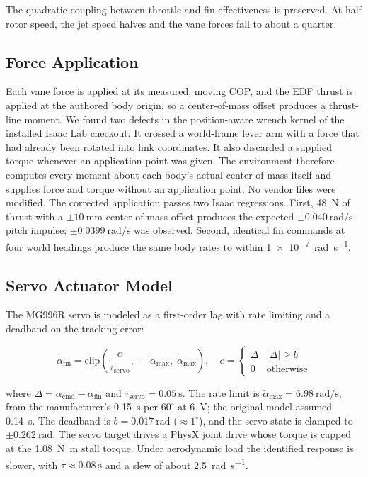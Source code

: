 \documentclass[conference]{IEEEtran}
\begin{document}
The quadratic coupling between throttle and fin effectiveness is preserved. At half rotor speed, the jet speed halves and the vane forces fall to about a quarter.

\subsection{Force Application}

Each vane force is applied at its measured, moving COP, and the EDF thrust is applied at the authored body origin, so a center-of-mass offset produces a thrust-line moment. We found two defects in the position-aware wrench kernel of the installed Isaac Lab checkout. It crossed a world-frame lever arm with a force that had already been rotated into link coordinates. It also discarded a supplied torque whenever an application point was given. The environment therefore computes every moment about each body's actual center of mass itself and supplies force and torque without an application point. No vendor files were modified. The corrected application passes two Isaac regressions. First, \SI{48}{\newton} of thrust with a $\pm\SI{10}{\milli\metre}$ center-of-mass offset produces the expected $\pm\SI{0.040}{\radian\per\second}$ pitch impulse; $\pm\SI{0.0399}{\radian\per\second}$ was observed. Second, identical fin commands at four world headings produce the same body rates to within \SI{1e-7}{\radian\per\second}.

\subsection{Servo Actuator Model}

The MG996R servo is modeled as a first-order lag with rate limiting and a deadband on the tracking error:

\begin{equation}
\dot{\alpha}_{\text{fin}} = \text{clip}\!\left(\frac{e}{\tau_{\text{servo}}},\; -\dot{\alpha}_{\max},\; \dot{\alpha}_{\max}\right), \quad
e = \begin{cases} \Delta & |\Delta| \ge b \\ 0 & \text{otherwise} \end{cases}
\label{eq:servo}
\end{equation}

\noindent where $\Delta = \alpha_{\text{cmd}} - \alpha_{\text{fin}}$ and $\tau_{\text{servo}} = \SI{0.05}{\second}$. The rate limit is $\dot{\alpha}_{\max} = \SI{6.98}{\radian\per\second}$, from the manufacturer's \SI{0.15}{\second} per $60^\circ$ at \SI{6}{\volt}; the original model assumed \SI{0.14}{\second}. The deadband is $b = \SI{0.017}{\radian}$ ($\approx 1^\circ$), and the servo state is clamped to $\pm\SI{0.262}{\radian}$. The servo target drives a PhysX joint drive whose torque is capped at the \SI{1.08}{\newton\metre} stall torque. Under aerodynamic load the identified response is slower, with $\tau \approx \SI{0.08}{\second}$ and a slew of about \SI{2.5}{\radian\per\second}.
\end{document}
